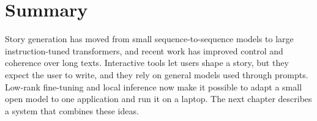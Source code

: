\section{Summary}
\label{sec:lit-summary}

Story generation has moved from small sequence-to-sequence models to large instruction-tuned transformers, and recent work has improved control and coherence over long texts. Interactive tools let users shape a story, but they expect the user to write, and they rely on general models used through prompts. Low-rank fine-tuning and local inference now make it possible to adapt a small open model to one application and run it on a laptop. The next chapter describes a system that combines these ideas.
